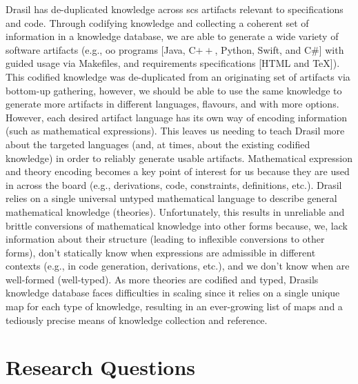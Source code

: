 Drasil has de-duplicated knowledge across \acs{scs} artifacts relevant to
specifications and code. Through codifying knowledge and collecting a coherent
set of information in a knowledge database, we are able to generate a wide
variety of software artifacts (e.g., \acs{oo} programs [Java, C$++$, Python,
            Swift, and C\#] with guided usage via Makefiles, and requirements specifications
      [HTML and TeX]). This codified knowledge was de-duplicated from an originating
set of artifacts via bottom-up gathering, however, we should be able to use the
same knowledge to generate more artifacts in different languages, flavours, and
with more options. However, each desired artifact language has its own way of
encoding information (such as mathematical expressions). This leaves us needing
to teach Drasil more about the targeted languages (and, at times, about the
existing codified knowledge) in order to reliably generate usable artifacts.
Mathematical expression and theory encoding becomes a key point of interest for
us because they are used in across the board (e.g., derivations, code,
constraints, definitions, etc.). Drasil relies on a single universal untyped
mathematical language to describe general mathematical knowledge (theories).
Unfortunately, this results in unreliable and brittle conversions of
mathematical knowledge into other forms because, we, lack information about
their structure (leading to inflexible conversions to other forms), don't
statically know when expressions are admissible in different contexts (e.g., in
code generation, derivations, etc.), and we don't know when are well-formed
(well-typed). As more theories are codified and typed, Drasils knowledge
database faces difficulties in scaling since it relies on a single unique map
for each type of knowledge, resulting in an ever-growing list of maps and a
tediously precise means of knowledge collection and reference.

\section{Research Questions}


